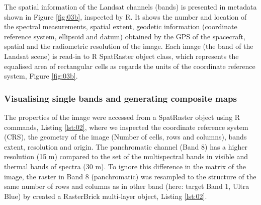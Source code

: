 \documentclass[algorithms,article,submit,pdftex,moreauthors]{Definitions/mdpi}
\begin{document}
The spatial information of the Landsat channels (bands) is presented in metadata shown in Figure \ref{fig:03b}, inspected by R. It shows the number and location of the spectral measurements, spatial extent, geodetic information (coordinate reference system, ellipsoid and datum) obtained by the GPS of the spacecraft, spatial and the radiometric resolution of the image. Each image (the band of the Landsat scene) is read-in to R SpatRaster object class, which represents the equalised area of rectangular cells as regards the units of the coordinate reference system, Figure \ref{fig:03b}. 

\subsubsection{Visualising single bands and generating composite maps}

The properties of the image were accessed from a SpatRaster object using R commands, Listing \ref{lst:02}, where we inspected the coordinate reference system (CRS), the geometry of the image (Number of cells, rows and columns), bands extent, resolution and origin. The panchromatic channel (Band 8) has a higher resolution (15 m) compared to the set of the multispectral bands in visible and thermal bands of spectra (30 m). To ignore this difference in the matrix of the image, the raster in Band 8 (panchromatic) was resampled to the structure of the same number of rows and columns as in other band (here: target Band 1, Ultra Blue) by created a RasterBrick multi-layer object, Listing \ref{lst:02}. 
\end{document}
